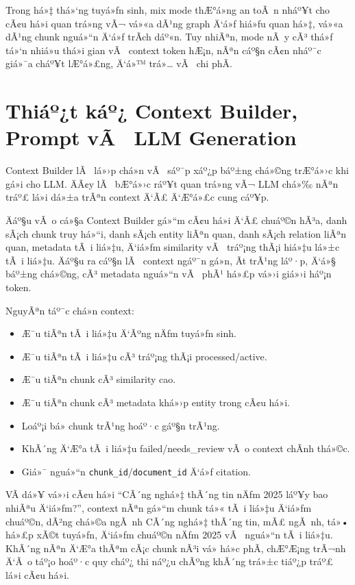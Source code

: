 ﻿\documentclass[12pt,a4paper]{report}
\begin{document}
Trong há»‡ thá»‘ng tuyá»ƒn sinh, mix mode thÆ°á»ng an toÃ n nháº¥t cho cÃ¢u há»i quan trá»ng vÃ¬ vá»«a dÃ¹ng graph Ä‘á»ƒ hiá»ƒu quan há»‡, vá»«a dÃ¹ng chunk nguá»“n Ä‘á»ƒ trÃ­ch dáº«n. Tuy nhiÃªn, mode nÃ y cÃ³ thá»ƒ tá»‘n nhiá»u thá»i gian vÃ  context token hÆ¡n, nÃªn cáº§n cÃ¢n nháº¯c giá»¯a cháº¥t lÆ°á»£ng, Ä‘á»™ trá»… vÃ  chi phÃ­.

\section{Thiáº¿t káº¿ Context Builder, Prompt vÃ  LLM Generation}

Context Builder lÃ  lá»›p chá»n vÃ  sáº¯p xáº¿p báº±ng chá»©ng trÆ°á»›c khi gá»­i cho LLM. ÄÃ¢y lÃ  bÆ°á»›c ráº¥t quan trá»ng vÃ¬ LLM chá»‰ nÃªn tráº£ lá»i dá»±a trÃªn context Ä‘Ã£ Ä‘Æ°á»£c cung cáº¥p.

Äáº§u vÃ o cá»§a Context Builder gá»“m cÃ¢u há»i Ä‘Ã£ chuáº©n hÃ³a, danh sÃ¡ch chunk truy há»“i, danh sÃ¡ch entity liÃªn quan, danh sÃ¡ch relation liÃªn quan, metadata tÃ i liá»‡u, Ä‘iá»ƒm similarity vÃ  tráº¡ng thÃ¡i hiá»‡u lá»±c tÃ i liá»‡u. Äáº§u ra cáº§n lÃ  context ngáº¯n gá»n, Ã­t trÃ¹ng láº·p, Ä‘á»§ báº±ng chá»©ng, cÃ³ metadata nguá»“n vÃ  phÃ¹ há»£p vá»›i giá»›i háº¡n token.

NguyÃªn táº¯c chá»n context:

\begin{itemize}
    \item Æ¯u tiÃªn tÃ i liá»‡u Ä‘Ãºng nÄƒm tuyá»ƒn sinh.
    \item Æ¯u tiÃªn tÃ i liá»‡u cÃ³ tráº¡ng thÃ¡i processed/active.
    \item Æ¯u tiÃªn chunk cÃ³ similarity cao.
    \item Æ¯u tiÃªn chunk cÃ³ metadata khá»›p entity trong cÃ¢u há»i.
    \item Loáº¡i bá» chunk trÃ¹ng hoáº·c gáº§n trÃ¹ng.
    \item KhÃ´ng Ä‘Æ°a tÃ i liá»‡u failed/needs\_review vÃ o context chÃ­nh thá»©c.
    \item Giá»¯ nguá»“n \texttt{chunk\_id}/\texttt{document\_id} Ä‘á»ƒ citation.
\end{itemize}

VÃ­ dá»¥ vá»›i cÃ¢u há»i ``CÃ´ng nghá»‡ thÃ´ng tin nÄƒm 2025 láº¥y bao nhiÃªu Ä‘iá»ƒm?'', context nÃªn gá»“m chunk tá»« tÃ i liá»‡u Ä‘iá»ƒm chuáº©n, dÃ²ng chá»©a ngÃ nh CÃ´ng nghá»‡ thÃ´ng tin, mÃ£ ngÃ nh, tá»• há»£p xÃ©t tuyá»ƒn, Ä‘iá»ƒm chuáº©n nÄƒm 2025 vÃ  nguá»“n tÃ i liá»‡u. KhÃ´ng nÃªn Ä‘Æ°a thÃªm cÃ¡c chunk nÃ³i vá» há»c phÃ­, chÆ°Æ¡ng trÃ¬nh Ä‘Ã o táº¡o hoáº·c quy cháº¿ thi náº¿u chÃºng khÃ´ng trá»±c tiáº¿p tráº£ lá»i cÃ¢u há»i.
\end{document}
